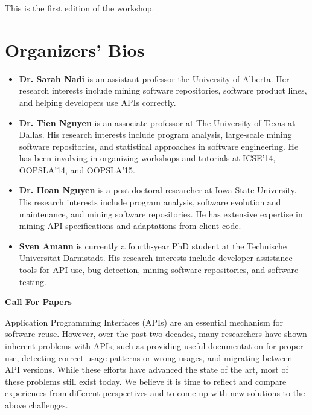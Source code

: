 \documentclass[10pt, conference]{IEEEtran}
\begin{document}
This is the first edition of the workshop.

\section{Organizers' Bios}
\begin{itemize}
\item \textbf{Dr. Sarah Nadi} is an assistant professor the University of Alberta. Her research interests include mining software repositories, software product lines, and helping developers use APIs correctly.

\item \textbf{Dr. Tien Nguyen} is an associate professor at The University of Texas at Dallas. His research interests include program analysis, large-scale mining software repositories, and statistical approaches in software engineering. He has been involving in organizing workshops and tutorials at ICSE’14, OOPSLA’14, and OOPSLA’15.

\item \textbf{Dr. Hoan Nguyen} is a post-doctoral researcher at Iowa State University. His research interests include program analysis, software evolution and maintenance, and mining software repositories. He has extensive expertise in mining API specifications and adaptations from client code. 

\item \textbf{Sven Amann} is currently a fourth-year PhD student at the Technische Universit\"{a}t Darmstadt. His research interests include developer-assistance tools for API use, bug detection, mining software repositories, and software testing.
\end{itemize}




\newpage
\onecolumn

\begin{center}
\Large{\textbf{Call For Papers}}
\end{center}

Application Programming Interfaces (APIs) are an essential mechanism for software reuse. However, over the past two decades, many researchers have shown inherent problems with APIs, such as providing useful documentation for proper use, detecting correct usage patterns or wrong usages, and migrating between API versions. While these efforts have advanced the state of the art, most of these problems still exist today. We believe it is time to reflect and compare experiences from different perspectives and to come up with new solutions to the above challenges. 
\end{document}
